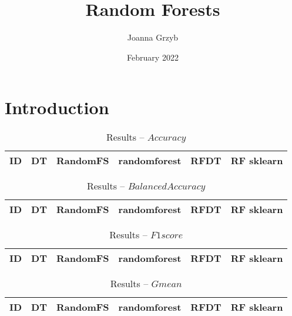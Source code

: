 \documentclass{llncs}
\title{Random Forests}
\author{Joanna Grzyb}
\date{February 2022}
\begin{document}
\maketitle

\section{Introduction}

\begin{table}[!ht]
\centering
\caption{Results -- $Accuracy$}
\begin{tabular}{r c c c c c}
  \hline
\textbf{ID} & \textbf{DT} & \textbf{RandomFS} & \textbf{randomforest} & \textbf{RFDT} & \textbf{RF sklearn}\\
    \hline
    
\end{tabular}
\end{table}

\begin{table}[!ht]
\centering
\caption{Results -- $Balanced Accuracy$}
\begin{tabular}{r c c c c c}
  \hline
\textbf{ID} & \textbf{DT} & \textbf{RandomFS} & \textbf{randomforest} & \textbf{RFDT} & \textbf{RF sklearn}\\
    \hline
    
\end{tabular}
\end{table}

\begin{table}[!ht]
\centering
\caption{Results -- $F1score$}
\begin{tabular}{r c c c c c}
  \hline
\textbf{ID} & \textbf{DT} & \textbf{RandomFS} & \textbf{randomforest} & \textbf{RFDT} & \textbf{RF sklearn}\\
    \hline
    
\end{tabular}
\end{table}

\begin{table}[!ht]
\centering
\caption{Results -- $Gmean$}
\begin{tabular}{r c c c c c}
  \hline
\textbf{ID} & \textbf{DT} & \textbf{RandomFS} & \textbf{randomforest} & \textbf{RFDT} & \textbf{RF sklearn}\\
    \hline
    
\end{tabular}
\end{table}
\end{document}

